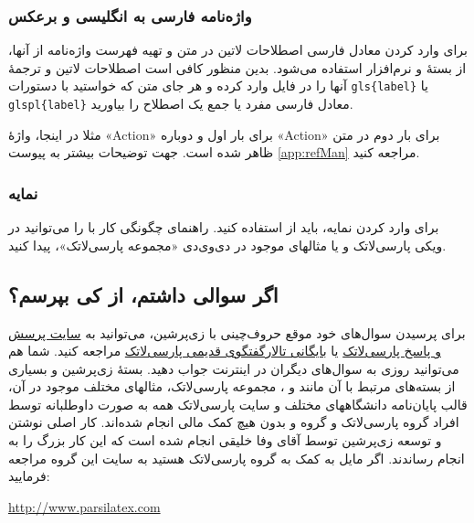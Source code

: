 \subsubsection{واژه‌نامه فارسی به انگلیسی و برعکس}
برای وارد کردن معادل فارسی اصطلاحات لاتین در متن و تهیه فهرست واژه‌نامه از آنها، از بستهٔ
و نرم‌افزار
استفاده می‌شود. بدین منظور کافی است اصطلاحات لاتین و ترجمهٔ آنها را در فایل
وارد کرده و هر جای متن که خواستید با دستورات
\verb|gls{label}|
یا \verb|glspl{label}|
معادل فارسی مفرد یا جمع یک اصطلاح را بیاورید.

مثلا در اینجا، واژهٔ
«\gls{Action}»
برای بار اول و دوباره
«\gls{Action}»
برای بار دوم در متن ظاهر شده است.
جهت توضیحات بیشتر به پیوست
\ref{app:refMan}
مراجعه کنید.
\subsubsection{نمایه}
برای وارد کردن نمایه، باید از 
استفاده کنید. 
راهنمای چگونگی کار با 
را می‌توانید در ویکی پارسی‌لاتک و یا مثالهای موجود در دی‌وی‌دی «مجموعه پارسی‌لاتک»، پیدا کنید.

\subsection{اگر سوالی داشتم، از کی بپرسم؟}
برای پرسیدن سوال‌های خود موقع حروف‌چینی با زی‌پرشین، می‌توانید به
\href{http://qa.parsilatex.com}{سایت پرسش و پاسخ پارسی‌لاتک}%
یا
\href{http://forum.parsilatex.com}{بایگانی تالارگفتگوی قدیمی پارسی‌لاتک}%
مراجعه کنید. شما هم می‌توانید روزی به سوال‌های دیگران در اینترنت جواب دهید.
بستهٔ زی‌پرشین و بسیاری از بسته‌های مرتبط با آن مانند
 و
،
مجموعه پارسی‌لاتک، مثالهای مختلف موجود در آن، قالب پایان‌نامه دانشگاههای مختلف و سایت پارسی‌لاتک همه به صورت داوطلبانه توسط افراد گروه پارسی‌لاتک و گروه
و بدون هیچ کمک مالی انجام شده‌اند. کار اصلی نوشتن و توسعه زی‌پرشین توسط آقای وفا خلیقی انجام شده است که این کار بزرگ را به انجام رساندند.
اگر مایل به کمک به گروه پارسی‌لاتک هستید به سایت این گروه مراجعه فرمایید:
\begin{center}
	\url{http://www.parsilatex.com}
\end{center}


